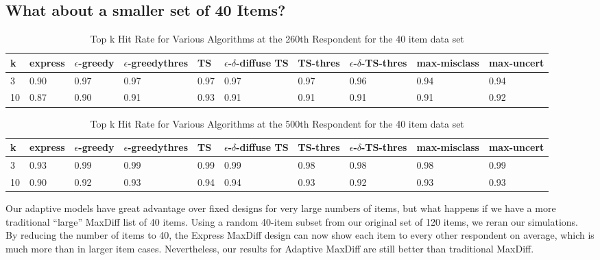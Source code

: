 \documentclass[nonblindrev]{informs3}
\newcommand{\fixedexpress}{\textbf{express}}
\newcommand{\egreedy}{$\epsilon$-\textbf{greedy}}
\newcommand{\egreedythres}{$\epsilon$-\textbf{greedythres}}
\newcommand{\mismin}{\textbf{max-misclass}}
\newcommand{\ts}{\textbf{TS} }
\newcommand{\edts}{$\epsilon$-$\delta$-\textbf{diffuse TS} }
\newcommand{\tsthres}{\textbf{TS-thres} }
\newcommand{\edtsthres}{$\epsilon$-$\delta$-\textbf{TS-thres} }
\newcommand{\uncert}{\textbf{max-uncert} }
\begin{document}
\subsection{What about a smaller set of 40 Items?}
\begin{table}
\begin{center}
\begin{tabular}{llllllllll}
\hline   k &  \fixedexpress & \egreedy&\egreedythres&\ts&\edts&\tsthres&\edtsthres& \mismin& \uncert  \\ \hline  3 & 0.90 & 0.97 &  0.97 &  0.97 & 0.97 & 0.97 &  0.96 & 0.94 &  0.94 \\  10 & 0.87 & 0.90 & 0.91 &  0.93 & 0.91 & 0.91 & 0.91 & 0.91 &  0.92  \end{tabular}
\end{center}
\caption{Top k Hit Rate for Various Algorithms at the 260th Respondent for the 40 item data set}
\label{table:40at260}
\end{table}

\begin{table}
\begin{center}
\begin{tabular}{llllllllll}
\hline   k &  \fixedexpress & \egreedy&\egreedythres&\ts&\edts&\tsthres&\edtsthres& \mismin& \uncert \\ \hline    
3 & 0.93 & 0.99 & 0.99 & 0.99 & 0.99 & 0.98 & 0.98 & 0.98 &  0.99 \\  10 & 0.90 &   0.92 &  0.93  & 0.94 & 0.94 & 0.93 &    0.92 & 0.93 &  0.93 \end{tabular}
\end{center}
\caption{Top k Hit Rate for Various Algorithms at the 500th Respondent for the 40 item data set}
\label{table:40at500}
\end{table}
Our adaptive models have great advantage over fixed designs for very large numbers of items, but what happens if we have a more traditional ``large'' MaxDiff list of 40 items. Using a random 40-item subset from our original set of 120 items, we reran our simulations. \\
By reducing the number of items to 40, the Express MaxDiff design can now show each item to every other respondent on average, which is much more than in larger item cases.
Nevertheless, our results for Adaptive MaxDiff are still better than traditional MaxDiff.
\end{document}
